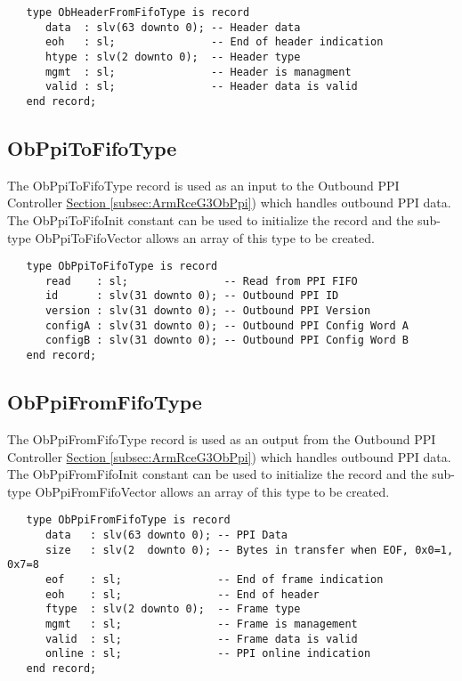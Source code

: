 \documentclass[11pt]{article}
\begin{document}
\small
\begin{verbatim}
   type ObHeaderFromFifoType is record
      data  : slv(63 downto 0); -- Header data
      eoh   : sl;               -- End of header indication
      htype : slv(2 downto 0);  -- Header type
      mgmt  : sl;               -- Header is managment
      valid : sl;               -- Header data is valid
   end record;
\end{verbatim}
\normalsize

\subsection{ObPpiToFifoType}
\label{subsec:ObPpiToFifoType}

The ObPpiToFifoType record is used as an input to the Outbound PPI Controller \hyperref[subsec:ArmRceG3ObPpi]{Section \ref*{subsec:ArmRceG3ObPpi}}) which handles outbound PPI data. 
The ObPpiToFifoInit constant can be used to initialize the record and the sub-type ObPpiToFifoVector allows an array of this type to be created.

\small
\begin{verbatim}
   type ObPpiToFifoType is record
      read    : sl;               -- Read from PPI FIFO
      id      : slv(31 downto 0); -- Outbound PPI ID
      version : slv(31 downto 0); -- Outbound PPI Version
      configA : slv(31 downto 0); -- Outbound PPI Config Word A
      configB : slv(31 downto 0); -- Outbound PPI Config Word B
   end record;
\end{verbatim}
\normalsize

\subsection{ObPpiFromFifoType}
\label{subsec:ObPpiFromFifoType}

The ObPpiFromFifoType record is used as an output from the Outbound PPI Controller \hyperref[subsec:ArmRceG3ObPpi]{Section \ref*{subsec:ArmRceG3ObPpi}}) which handles outbound PPI data. 
The ObPpiFromFifoInit constant can be used to initialize the record and the sub-type ObPpiFromFifoVector allows an array of this type to be created.

\small
\begin{verbatim}
   type ObPpiFromFifoType is record
      data   : slv(63 downto 0); -- PPI Data
      size   : slv(2  downto 0); -- Bytes in transfer when EOF, 0x0=1, 0x7=8
      eof    : sl;               -- End of frame indication
      eoh    : sl;               -- End of header
      ftype  : slv(2 downto 0);  -- Frame type
      mgmt   : sl;               -- Frame is management
      valid  : sl;               -- Frame data is valid
      online : sl;               -- PPI online indication
   end record;
\end{verbatim}
\normalsize
\end{document}
